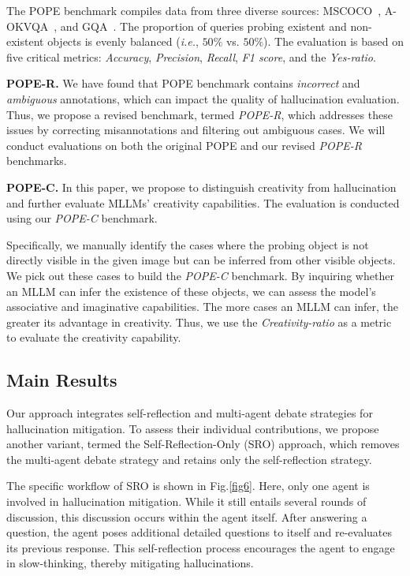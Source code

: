 \documentclass[10pt,twocolumn,letterpaper]{article}
\begin{document}
The POPE benchmark compiles data from three diverse sources: MSCOCO~\cite{lin2014microsoft}, A-OKVQA~\cite{schwenk2022okvqa}, and GQA~\cite{hudson2019gqa}. The proportion of queries probing existent and non-existent objects is evenly balanced (\emph{i.e.}, $50\%$ vs. $50\%$). The evaluation is based on five critical metrics: \emph{Accuracy}, \emph{Precision}, \emph{Recall}, \emph{F1 score}, and the \emph{Yes-ratio}.


\noindent\textbf{POPE-R.} 
We have found that POPE benchmark contains \emph{incorrect} and \emph{ambiguous} annotations, which can impact the quality of hallucination evaluation. Thus, we propose a revised benchmark, termed \emph{POPE-R}, which addresses these issues by correcting misannotations and filtering out ambiguous cases. We will conduct evaluations on both the original POPE and our revised \emph{POPE-R} benchmarks.


\noindent\textbf{POPE-C.} 
In this paper, we propose to distinguish creativity from hallucination and further evaluate MLLMs' creativity capabilities. The evaluation is conducted using our \emph{POPE-C} benchmark. 

Specifically, we manually identify the cases where the probing object is not directly visible in the given image but can be inferred from other visible objects. We pick out these cases to build the \emph{POPE-C} benchmark. By inquiring whether an MLLM can infer the existence of these objects, we can assess the model's associative and imaginative capabilities.
The more cases an MLLM can infer, the greater its advantage in creativity. Thus, we use the \emph{Creativity-ratio} as a metric to evaluate the creativity capability.


\subsection{Main Results}
Our approach integrates self-reflection and multi-agent debate strategies for hallucination mitigation. To assess their individual contributions, we propose another variant, termed the Self-Reflection-Only (SRO) approach, which removes the multi-agent debate strategy and retains only the self-reflection strategy.

The specific workflow of SRO is shown in Fig.\ref{fig6}. Here, only one agent is involved in hallucination mitigation. While it still entails several rounds of discussion, this discussion occurs within the agent itself. After answering a question, the agent poses additional detailed questions to itself and re-evaluates its previous response. This self-reflection process encourages the agent to engage in slow-thinking, thereby mitigating hallucinations.
\end{document}
